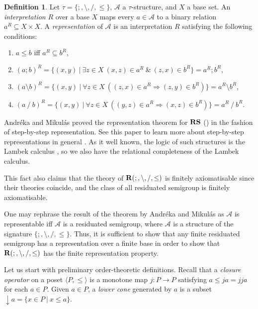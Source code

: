 \documentclass[a4paper]{article}
\theoremstyle{definition}
\newtheorem{definition}{Definition}
\theoremstyle{theorem}
\theoremstyle{proposition}
\theoremstyle{lemma}
\theoremstyle{ex}
\theoremstyle{corollary}
\theoremstyle{claim}
\begin{document}
\begin{definition}
  Let $\tau = \{ ;, \setminus, /, \leq \}$, $\mathcal{A}$ a $\tau$-structure, and $X$ a base set. An \emph{interpretation} $R$ over a base $X$ maps every $a \in \mathcal{A}$ to a binary relation $a^R \subseteq X \times X$. A \emph{representation} of $\mathcal{A}$ is an interpretation $R$ satisfying the following conditions:

  \begin{enumerate}
    \item $a \leq b$ iff $a^R \subseteq b^R$,
    \item $(a;b)^R = \{ (x, y) \: | \: \exists z \in X \: (x, z) \in a^R \: \& \: (z, x) \in b^R \} = a^R ; b^R$,
    \item $(a \setminus b)^{R} = \{ (x, y) \: | \: \forall z \in X \: ((z, x) \in a^R \Rightarrow (z, y) \in b^R)\} = a^R \setminus b^R$,
    \item $(a \: / \: b)^{R} = \{ (x, y) \: | \: \forall z \in X \: ((y, z) \in a^R \Rightarrow (x, z) \in b^R)\} = a^R \: / \: b^R$.
  \end{enumerate}
\end{definition}

 Andr\'{e}ka and Mikul\'{a}s proved the representation theorem for ${\bf RS}$ (\cite{andreka1994lambek}) in the fashion of step-by-step representation. See this paper to learn more about step-by-step representations in general \cite{hirsch1997step}. As it well known, the logic of such structures is the Lambek calculus \cite{lambek1958mathematics}, so we also have the relational completeness of the Lambek calculus.

This fact also claims that the theory of ${\bf R}(;, \setminus, /, \leq)$ is finitely axiomatisable since their theories coincide, and the class of all residuated semigroup is finitely axiomatisable.

One may rephrase the result of the theorem by Andr\'{e}ka and Mikul\'{a}s as $\mathcal{A}$ is representable iff $\mathcal{A}$ is a residuated semigroup, where $\mathcal{A}$ is a structure of the signature $\{ ;, \setminus, /, \leq \}$. Thus, it is sufficient to show that any finite residuated semigroup has a representation over a finite base in order to show that ${\bf R}(;, \setminus, /, \leq)$ has the finite representation property.

Let us start with preliminary order-theoretic definitions. Recall that a \emph{closure operator} on a poset $\langle P, \leq \rangle$ is a monotone map $j : P \to P$ satisfying $a \leq j a = j j a$ for each $a \in P$. Given $a \in P$, a \emph{lower cone} generated by $a$ is a subset $\downarrow a = \{ x \in P \: | \: x \leq a \}$.
\end{document}
